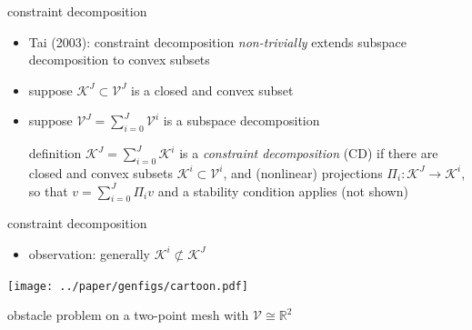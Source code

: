 \documentclass[svgnames,
               hyperref={colorlinks,citecolor=DeepPink4,linkcolor=FireBrick,urlcolor=Maroon},
               usepdftitle=false]  %
               {beamer}
\newcommand{\RR}{\mathbb{R}}
\newcommand{\ds}{\displaystyle}
\begin{document}
\begin{frame}{constraint decomposition}

\begin{itemize}
\item Tai (2003): constraint decomposition \emph{non-trivially} extends subspace decomposition to convex subsets
\item suppose $\mathcal{K}^J \subset \mathcal{V}^J$ is a closed and convex subset
\item suppose $\mathcal{V}^J = \sum_{i=0}^J \mathcal{V}^i$ is a subspace decomposition
\begin{block}{definition}
$\ds \mathcal{K}^J = \sum_{i=0}^J \mathcal{K}^i$ \quad is a \emph{constraint decomposition} (CD) if there are closed and convex subsets $\mathcal{K}^i\subset \mathcal{V}^i$, and (nonlinear) projections $\Pi_i : \mathcal{K}^J \to \mathcal{K}^i$, so that $\ds v = \sum_{i=0}^J \Pi_i v$ and a stability condition applies (not shown)
\end{block}
\end{itemize}
\end{frame}


\begin{frame}{constraint decomposition}

\begin{itemize}
\item observation: generally $\mathcal{K}^i \not\subset \mathcal{K}^J$
\end{itemize}

\bigskip
\begin{center}
\texttt{[image: ../paper/genfigs/cartoon.pdf]}

\medskip
{\small obstacle problem on a two-point mesh with $\mathcal{V} \cong \RR^2$}
\end{center}
\end{frame}
\end{document}
